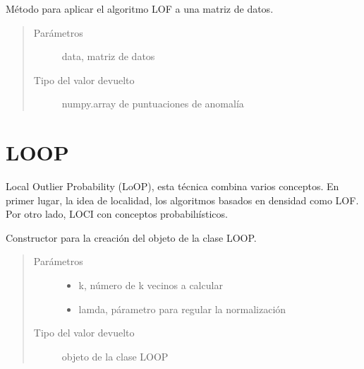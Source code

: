 \documentclass[letterpaper,10pt,spanish]{sphinxmanual}
\begin{document}

\begin{fulllineitems}
\label{\detokenize{index:fit_predict}}
Método para aplicar el algoritmo LOF a una matriz de datos.
\begin{quote}\begin{description}
\item[{Parámetros}] \leavevmode
{} \textendash{} data, matriz de datos

\item[{Tipo del valor devuelto}] \leavevmode
numpy.array de puntuaciones de anomalía

\end{description}\end{quote}

\end{fulllineitems}



\chapter{LOOP}
\label{\detokenize{index:loop}}
Local Outlier Probability (LoOP), esta técnica combina varios conceptos.
En primer lugar, la idea de localidad, los algoritmos basados en densidad
como LOF. Por otro lado, LOCI
con conceptos probabilıísticos.

\begin{fulllineitems}
\label{\detokenize{index:LOOP}}
Constructor para la creación del objeto de la clase LOOP.
\begin{quote}\begin{description}
\item[{Parámetros}] \leavevmode\begin{itemize}
\item {} 
 \textendash{} k, número de k vecinos a calcular

\item {} 
 \textendash{} lamda, párametro para regular la normalización

\end{itemize}

\item[{Tipo del valor devuelto}] \leavevmode
objeto de la clase LOOP

\end{description}\end{quote}

\end{fulllineitems}
\end{document}
